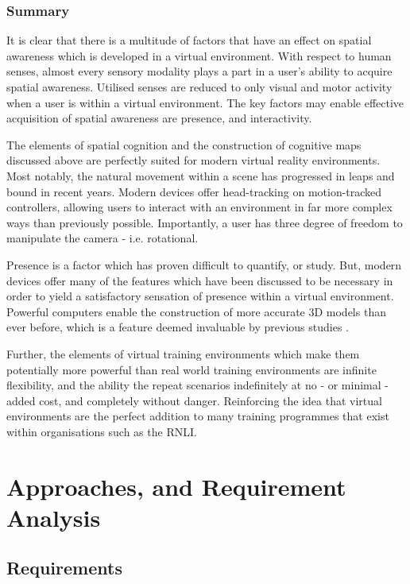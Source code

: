\documentclass[ %
                    author={Elis Jones},
                supervisor={Dr. Kirsten Cater},
                    degree={BSc},
                     title={The Effect of Presentation Medium on Spatial Cognition},
                  subtitle={in the Virtual Environment},
                      year={2018} ]{dissertation}
\begin{document}
\subsection{Summary}\label{intro-summary}
It is clear that there is a multitude of factors that have an effect on spatial awareness which is developed in a virtual environment. With respect to human senses, almost every sensory modality plays a part in a user's ability to acquire spatial awareness. Utilised senses are reduced to only visual and motor activity when a user is within a virtual environment. The key factors may enable effective acquisition of spatial awareness are presence, and interactivity. 

The elements of spatial cognition and the construction of cognitive maps discussed above are perfectly suited for modern virtual reality environments. Most notably, the natural movement within a scene has progressed in leaps and bound in recent years. Modern devices offer head-tracking on motion-tracked controllers, allowing users to interact with an environment in far more complex ways than previously possible. Importantly, a user has three degree of freedom to manipulate the camera - i.e. rotational. 

Presence is a factor which has proven difficult to quantify, or study. But, modern devices offer many of the features which have been discussed to be necessary in order to yield a satisfactory sensation of presence within a virtual environment. Powerful computers enable the construction of more accurate 3D models than ever before, which is a feature deemed invaluable by previous studies \citep{steuer}. 

Further, the elements of virtual training environments which make them potentially more powerful than real world training environments are infinite flexibility, and the ability the repeat scenarios indefinitely at no - or minimal - added cost, and completely without danger. Reinforcing the idea that virtual environments are the perfect addition to many training programmes that exist within organisations such as the RNLI.


\chapter{Approaches, and Requirement Analysis}

\section{Requirements}
\end{document}
